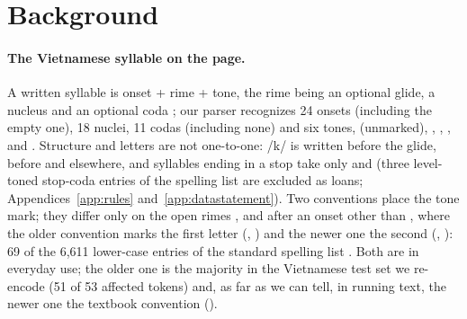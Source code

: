 \section{Background}
\label{sec:background}

\paragraph{The Vietnamese syllable on the page.}
A written syllable is onset + rime + tone, the rime being an optional glide, a nucleus and an optional coda \citep{thompson-1965-vietnamese,doan-1977-nguam,nguyen-1997-vietnamese}; our parser recognizes 24 onsets (including the empty one), 18 nuclei, 11 codas (including none) and six tones,  (unmarked), , , ,  and  \citep{kirby-2011-vietnamese,pham-2003-vietnamese-tone}. Structure and letters are not one-to-one: /k/ is written  before the glide,  before  and  elsewhere, and syllables ending in a stop take only  and  (three level-toned stop-coda entries of the spelling list are excluded as loans; Appendices~\ref{app:rules} and~\ref{app:datastatement}). Two conventions place the tone mark; they differ only on the open rimes ,  and  after an onset other than , where the older convention marks the first letter (, ) and the newer one the second (, ): 69 of the 6,611 lower-case entries of the standard spelling list \citep{hunspell-vi}. Both are in everyday use; the older one is the majority in the Vietnamese test set we re-encode (51 of 53 affected tokens) and, as far as we can tell, in running text, the newer one the textbook convention ().

